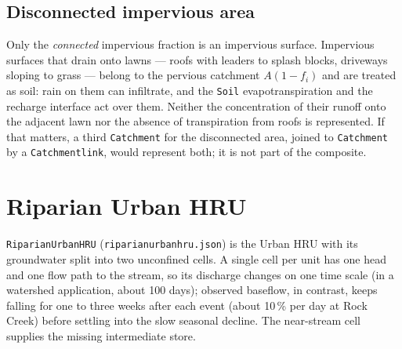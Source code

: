 \documentclass[11pt,a4paper]{article}
\newcommand{\code}[1]{\texttt{\small #1}}
\newcommand{\file}[1]{\texttt{\small #1}}
\renewcommand{\_}{\oldus\allowbreak}   %
\begin{document}
\subsection{Disconnected impervious area}
\label{sec:disconnected}
Only the \emph{connected} impervious fraction is an impervious surface. Impervious surfaces that drain
onto lawns --- roofs with leaders to splash blocks, driveways sloping to grass --- belong to the
pervious catchment $A(1-f_i)$ and are treated as soil: rain on them can infiltrate, and the
\code{Soil\_1} evapotranspiration and the recharge interface act over them. Neither the concentration
of their runoff onto the adjacent lawn nor the absence of transpiration from roofs is represented. If
that matters, a third \code{Catchment} for the disconnected area, joined to \code{Catchment} by a
\code{Catchment\_link}, would represent both; it is not part of the composite.

\section{Riparian Urban HRU}
\label{sec:riparian}
\code{Riparian\_Urban\_HRU} (\file{riparian\_urban\_hru.json}) is the Urban HRU with its groundwater split
into two unconfined cells. A single cell per unit has one head and one flow path to the stream, so its
discharge changes on one time scale (in a watershed application, about 100 days); observed baseflow, in
contrast, keeps falling for one to three weeks after each event (about 10\,\% per day at Rock Creek) before
settling into the slow seasonal decline. The near-stream cell supplies the missing intermediate store.
\end{document}

